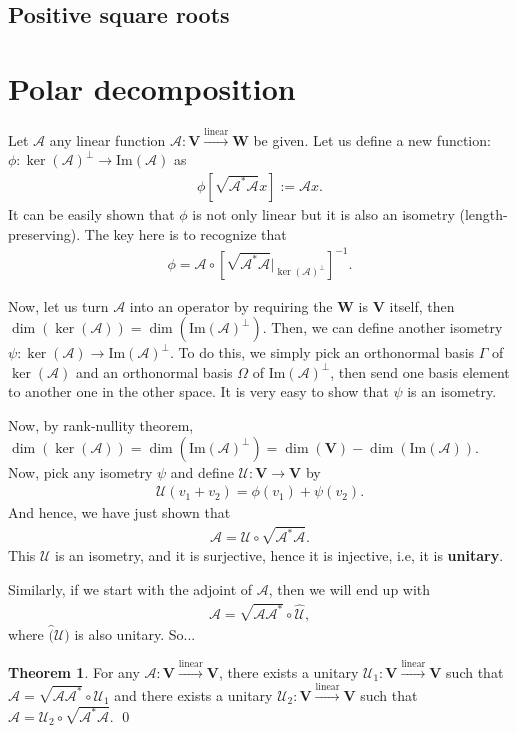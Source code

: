 \documentclass{article}
\theoremstyle{definition}
\newtheorem{thm}{Theorem}[section]
\newcommand{\Uni}{\mathcal{U}}
\newcommand{\V}{\mathbf{V}}
\newcommand{\W}{\mathbf{W}}
\newcommand{\A}{\mathcal{A}}
\newcommand{\ima}{\text{Im}}
\newcommand{\lin}{\overset{\text{linear}}{\longrightarrow}}
\newcommand{\lb}{\left[}
\newcommand{\rb}{\right]}
\begin{document}
\subsection{Positive square roots}
\newpage 

\section{Polar decomposition}

Let $\A$ any linear function $\A : \V \lin \W$ be given. Let us define a new function:
$
\phi: \ker(\A)^\perp \to \ima(\A) 
$
as
\begin{align*}
\phi \lb \sqrt{\A^*\A} x\rb := \A x.
\end{align*}
It can be easily shown that $\phi$ is not only linear but it is also an isometry (length-preserving). The key here is to recognize that 
\begin{align*}
\phi = \A \circ \lb \sqrt{\A^*\A} \bigg\vert_{\ker(\A)^\perp} \rb^{-1}.
\end{align*}



Now, let us turn $\A$ into an operator by requiring the $\W$ is $\V$ itself, then $\dim(\ker(\A)) = \dim(\ima(\A)^\perp)$. Then, we can define another isometry $\psi: \ker(\A ) \to \ima(\A)^\perp$. To do this, we simply pick an orthonormal basis $\Gamma$ of $\ker(\A)$ and an orthonormal basis $\Omega$ of $\ima(\A)^\perp$, then send one basis element to another one in the other space. It is very easy to show that $\psi$ is an isometry. 


Now, by rank-nullity theorem, $\dim(\ker(\A)) = \dim(\ima(\A)^\perp) = \dim(\V)  - \dim(\ima(\A))$. Now, pick any isometry $\psi$ and define
$
\Uni : \V \to \V 
$
by 
\begin{align*}
\Uni(v_1 + v_2) = \phi(v_1) + \psi(v_2). 
\end{align*}
And hence, we have just shown that
\begin{align*}
\A = \Uni \circ \sqrt{\A^*\A}.
\end{align*}
This $\Uni$ is an isometry, and it is surjective, hence it is injective, i.e, it is \textbf{unitary}. 

Similarly, if we start with the adjoint of $\A$, then we will end up with
\begin{align*}
\A = \sqrt{\A\A^*}\circ \hat{\Uni},
\end{align*}
where $\hat(\Uni)$ is also unitary. So...

\begin{thm}
	For any $\A : \V \lin \V$, there exists a unitary $\Uni_1: \V \lin \V$ such that $\A = \sqrt{\A\A^*} \circ \Uni_1$ and there exists a unitary $\Uni_2 : \V \lin \V$ such that $\A = \Uni_2 \circ \sqrt{\A^*\A}$. \qed
\end{thm}
\end{document}
